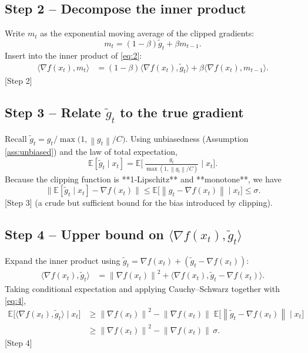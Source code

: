 \documentclass{article}
\newcommand{\EE}{\mathbb{E}}
\newcommand{\norm}[1]{\left\|#1\right\|}
\newcommand{\grad}{\nabla}
\begin{document}
\subsection*{Step 2 – Decompose the inner product}
Write $m_t$ as the exponential moving average of the clipped gradients:
\[
    m_t = (1-\beta)\tilde g_t + \beta m_{t-1}.
\]
Insert into the inner product of \eqref{eq:2}:
\begin{align}
    \langle\grad f(x_t), m_t\rangle
    &= (1-\beta)\langle\grad f(x_t), \tilde g_t\rangle
       + \beta\langle\grad f(x_t), m_{t-1}\rangle .
\tag{3}
\end{align}
[Step 2]

\subsection*{Step 3 – Relate $\tilde g_t$ to the true gradient}
Recall $\tilde g_t = g_t / \max\bigl(1,\norm{g_t}/C\bigr)$. Using unbiasedness (Assumption \ref{ass:unbiased}) and the law of total expectation,
\[
    \EE[\tilde g_t\mid x_t] = \EE\!\bigl[\,\tfrac{g_t}{\max(1,\norm{g_t}/C)}\mid x_t\bigr].
\]
Because the clipping function is **1‑Lipschitz** and **monotone**, we have
\[
    \bigl\lVert\EE[\tilde g_t\mid x_t]-\grad f(x_t)\bigr\rVert
    \le \EE\!\bigl[\norm{g_t-\grad f(x_t)}\mid x_t\bigr]
    \le \sigma .
\tag{4}
\]
[Step 3] (a crude but sufficient bound for the bias introduced by clipping).

\subsection*{Step 4 – Upper bound on $\langle\grad f(x_t),\tilde g_t\rangle$}
Expand the inner product using $\tilde g_t = \grad f(x_t) + (\tilde g_t-\grad f(x_t))$:
\begin{align}
    \langle\grad f(x_t),\tilde g_t\rangle
    &= \norm{\grad f(x_t)}^2
       +\langle\grad f(x_t),\tilde g_t-\grad f(x_t)\rangle .
\end{align}
Taking conditional expectation and applying Cauchy–Schwarz together with \eqref{eq:4},
\begin{align}
    \EE\!\bigl[\langle\grad f(x_t),\tilde g_t\rangle\mid x_t\bigr]
    &\ge \norm{\grad f(x_t)}^2
       - \norm{\grad f(x_t)}\;\EE\!\bigl[\norm{\tilde g_t-\grad f(x_t)}\mid x_t\bigr] \nonumber\\
    &\ge \norm{\grad f(x_t)}^2 - \norm{\grad f(x_t)}\,\sigma .
\tag{5}
\end{align}
[Step 4]
\end{document}
